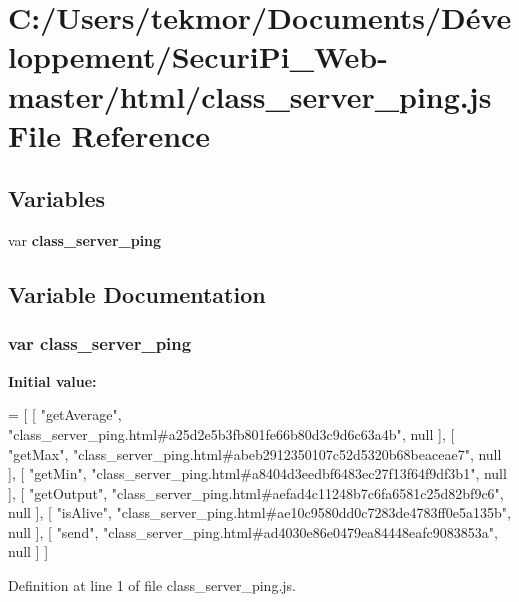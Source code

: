 \section{C\+:/\+Users/tekmor/\+Documents/\+Développement/\+Securi\+Pi\+\_\+\+Web-\/master/html/class\+\_\+server\+\_\+ping.js File Reference}
\label{class__server__ping_8js}
\subsection*{Variables}
\begin{DoxyCompactItemize}
\item 
var {\bf class\+\_\+server\+\_\+ping}
\end{DoxyCompactItemize}


\subsection{Variable Documentation}
\subsubsection[{class\+\_\+server\+\_\+ping}]{\setlength{\rightskip}{0pt plus 5cm}var class\+\_\+server\+\_\+ping}\label{class__server__ping_8js_ab15dd881abfc441577a973b9871ad04d}
{\bfseries Initial value\+:}
\begin{DoxyCode}
=
[
    [ \textcolor{stringliteral}{"getAverage"}, \textcolor{stringliteral}{"class\_server\_ping.html#a25d2e5b3fb801fe66b80d3c9d6c63a4b"}, null ],
    [ \textcolor{stringliteral}{"getMax"}, \textcolor{stringliteral}{"class\_server\_ping.html#abeb2912350107c52d5320b68beaceae7"}, null ],
    [ \textcolor{stringliteral}{"getMin"}, \textcolor{stringliteral}{"class\_server\_ping.html#a8404d3eedbf6483ec27f13f64f9df3b1"}, null ],
    [ \textcolor{stringliteral}{"getOutput"}, \textcolor{stringliteral}{"class\_server\_ping.html#aefad4c11248b7c6fa6581c25d82bf9c6"}, null ],
    [ \textcolor{stringliteral}{"isAlive"}, \textcolor{stringliteral}{"class\_server\_ping.html#ae10c9580dd0c7283de4783ff0e5a135b"}, null ],
    [ \textcolor{stringliteral}{"send"}, \textcolor{stringliteral}{"class\_server\_ping.html#ad4030e86e0479ea84448eafc9083853a"}, null ]
]
\end{DoxyCode}


Definition at line 1 of file class\+\_\+server\+\_\+ping.\+js.

